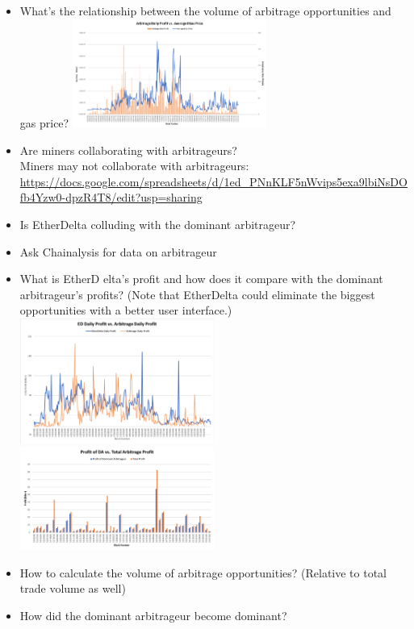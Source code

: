 \documentclass[conference]{IEEEtran}
\begin{document}
\begin{itemize}
    \item What’s the relationship between the volume of arbitrage opportunities and gas price?
    \includegraphics[width=0.5\textwidth]{figures/arb_daily_profit_vs_ave_gas_price.png}
    \item Are miners collaborating with arbitrageurs?\\
    Miners may not collaborate with arbitrageurs:\\
    \url{https://docs.google.com/spreadsheets/d/1ed_PNnKLF5nWvips5exa9lbiNsDOfb4Yzw0-dpzR4T8/edit?usp=sharing}
    \item Is EtherDelta colluding with the dominant arbitrageur?
    \item Ask Chainalysis for data on arbitrageur
    \item What is EtherD
    elta’s profit and how does it compare with the dominant arbitrageur’s profits? (Note that EtherDelta could eliminate the biggest opportunities with a better user interface.)
    \includegraphics[width=0.5\textwidth]{figures/ed_arb_daily_profit.png}
    \includegraphics[width=0.5\textwidth]{figures/profit_da_vs_total.png}
    \item How to calculate the volume of arbitrage opportunities? (Relative to total trade volume as well)
    \item How did the dominant arbitrageur become dominant?
    

\end{itemize}
\end{document}
